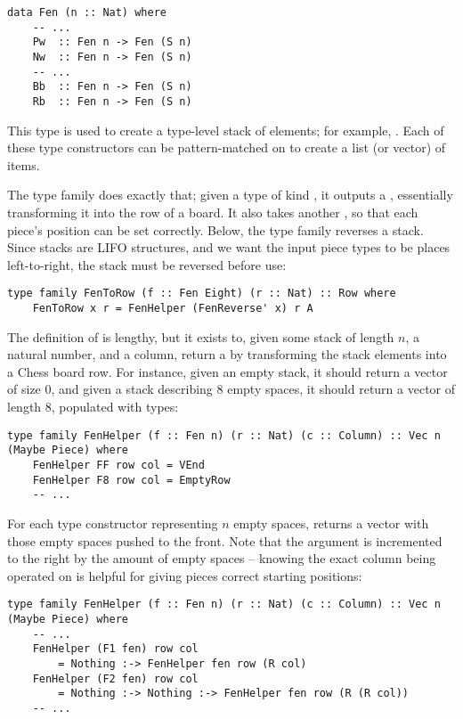\begin{lstlisting}
data Fen (n :: Nat) where
    -- ...
    Pw  :: Fen n -> Fen (S n)
    Nw  :: Fen n -> Fen (S n)
    -- ...
    Bb  :: Fen n -> Fen (S n)
    Rb  :: Fen n -> Fen (S n)
\end{lstlisting}

This  type is used to create a type-level stack of elements; for example, . Each of these  type constructors can be pattern-matched on to create a list (or vector) of items.

The type family  does exactly that; given a type of kind , it outputs a , essentially transforming it into the row of a board. It also takes another , so that each piece's position can be set correctly. Below, the type family  reverses a  stack. Since stacks are LIFO structures, and we want the input piece types to be places left-to-right, the stack must be reversed before use:

\begin{lstlisting}
type family FenToRow (f :: Fen Eight) (r :: Nat) :: Row where
    FenToRow x r = FenHelper (FenReverse' x) r A
\end{lstlisting}

The definition of  is lengthy, but it exists to, given some  stack of length $n$, a natural number, and a column, return a  by transforming the stack elements into a Chess board row. For instance, given an empty stack, it should return a vector of size 0, and given a stack describing 8 empty spaces, it should return a vector of length 8, populated with  types:

\begin{lstlisting}
type family FenHelper (f :: Fen n) (r :: Nat) (c :: Column) :: Vec n (Maybe Piece) where
    FenHelper FF row col = VEnd
    FenHelper F8 row col = EmptyRow
    -- ...
\end{lstlisting}

For each type constructor representing $n$ empty spaces,  returns a vector with those empty spaces pushed to the front. Note that the  argument is incremented to the right by the amount of empty spaces -- knowing the exact column being operated on is helpful for giving pieces correct starting positions:

\begin{lstlisting}
type family FenHelper (f :: Fen n) (r :: Nat) (c :: Column) :: Vec n (Maybe Piece) where
    -- ...
    FenHelper (F1 fen) row col
        = Nothing :-> FenHelper fen row (R col)
    FenHelper (F2 fen) row col
        = Nothing :-> Nothing :-> FenHelper fen row (R (R col))
    -- ...
\end{lstlisting}

